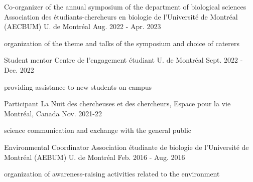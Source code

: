
\begin{cventries}

  \cventry
    {Co-organizer of the annual symposium of the department of biological sciences} %
    {Association des étudiants-chercheurs en biologie de l'Université de Montréal (AECBUM)} %
    {U. de Montréal} %
    {Aug. 2022 - Apr. 2023} %
    {
      \begin{cvitems} %
        \item {organization of the theme and talks of the symposium and choice of caterers}
      \end{cvitems}
    }

  \cventry
    {Student mentor} %
    {Centre de l'engagement étudiant} %
    {U. de Montréal} %
    {Sept. 2022 - Dec. 2022} %
    {
      \begin{cvitems} %
        \item {providing assistance to new students on campus}
      \end{cvitems}
    }

  \cventry
    {Participant} %
    {La Nuit des chercheuses et des chercheurs, Espace pour la vie} %
    {Montréal, Canada} %
    {Nov. 2021-22} %
    {
      \begin{cvitems} %
        \item {science communication and exchange with the general public}
      \end{cvitems}
    }

  \cventry
    {Environmental Coordinator} %
    {Association étudiante de biologie de l'Université de Montréal (AEBUM)} %
    {U. de Montréal} %
    {Feb. 2016 - Aug. 2016} %
    {
      \begin{cvitems} %
            \item {organization of awareness-raising activities related to the environment}
      \end{cvitems}
    }


\end{cventries}
